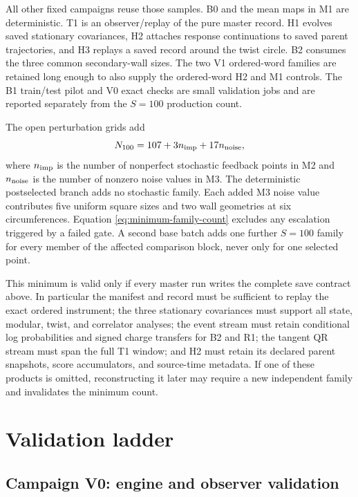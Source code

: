 \documentclass[aps,prx,onecolumn,nofootinbib,superscriptaddress,longbibliography]{revtex4-2}
\begin{document}
All other fixed campaigns reuse those samples.  B0 and the mean maps in M1 are
deterministic.  T1 is an observer/replay of the pure master record.  H1 evolves saved
stationary covariances, H2 attaches response continuations to saved parent trajectories,
and H3 replays a saved record around the twist circle.  B2 consumes the three common
secondary-wall sizes.  The two V1 ordered-word families are retained long enough to also
supply the ordered-word H2 and M1 controls.  The B1 train/test pilot and V0 exact checks are
small validation jobs and are reported separately from the $S=100$ production count.

The open perturbation grids add
\begin{equation}
 N_{100}=107+3n_{\rm imp}+17n_{\rm noise},
 \label{eq:minimum-family-count}
\end{equation}
where $n_{\rm imp}$ is the number of nonperfect stochastic feedback points in M2 and
$n_{\rm noise}$ is the number of nonzero noise values in M3.  The deterministic
postselected branch adds no stochastic family.  Each added M3 noise value contributes five
uniform square sizes and two wall geometries at six circumferences.  Equation
\eqref{eq:minimum-family-count} excludes any escalation triggered by a failed gate.  A
second base batch adds one further $S=100$ family for every member of the affected
comparison block, never only for one selected point.

This minimum is valid only if every master run writes the complete save contract above.
In particular the manifest and record must be sufficient to replay the exact ordered
instrument; the three stationary covariances must support all state, modular, twist, and
correlator analyses; the event stream must retain conditional log probabilities and signed
charge transfers for B2 and R1; the tangent QR stream must span the full T1 window; and H2
must retain its declared parent snapshots, score accumulators, and source-time metadata.
If one of these products is omitted, reconstructing it later may require a new independent
family and invalidates the minimum count.

\section{Validation ladder}

\subsection{Campaign V0: engine and observer validation}
\end{document}
